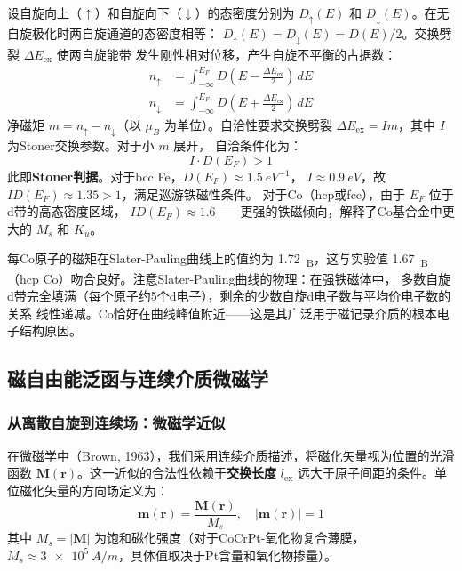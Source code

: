 \documentclass[11pt,a4paper,twoside]{article}
\theoremstyle{definition}
\theoremstyle{plain}
\theoremstyle{remark}
\begin{document}
设自旋向上（$\uparrow$）和自旋向下（$\downarrow$）的态密度分别为
$D_\uparrow(E)$ 和 $D_\downarrow(E)$。在无自旋极化时两自旋通道的态密度相等：
$D_\uparrow(E) = D_\downarrow(E) = D(E)/2$。交换劈裂 $\Delta E_{\text{ex}}$ 使两自旋能带
发生刚性相对位移，产生自旋不平衡的占据数：
\begin{align}
  n_\uparrow &= \int_{-\infty}^{E_F} D\left(E - \frac{\Delta E_{\text{ex}}}{2}\right)\, dE \\
  n_\downarrow &= \int_{-\infty}^{E_F} D\left(E + \frac{\Delta E_{\text{ex}}}{2}\right)\, dE
\end{align}
净磁矩 $m = n_\uparrow - n_\downarrow$（以 $\mu_B$ 为单位）。自洽性要求交换劈裂
$\Delta E_{\text{ex}} = I m$，其中 $I$ 为Stoner交换参数。对于小 $m$ 展开，
自洽条件化为：
\begin{equation}\label{eq:stoner-criterion}
  I \cdot D(E_F) > 1
\end{equation}
此即\textbf{Stoner判据}。对于bcc Fe，$D(E_F) \approx \SI{1.5}{eV^{-1}}$，
$I \approx \SI{0.9}{eV}$，故 $I D(E_F) \approx 1.35 > 1$，满足巡游铁磁性条件。
对于Co（hcp或fcc），由于 $E_F$ 位于d带的高态密度区域，
$I D(E_F) \approx 1.6$——更强的铁磁倾向，解释了Co基合金中更大的 $M_s$ 和 $K_u$。

每Co原子的磁矩在Slater-Pauling曲线上的值约为 \SI{1.72}{\mu_B}，这与实验值
\SI{1.67}{\mu_B}（hcp Co）吻合良好。注意Slater-Pauling曲线的物理：在强铁磁体中，
多数自旋d带完全填满（每个原子约5个d电子），剩余的少数自旋d电子数与平均价电子数的关系
线性递减。Co恰好在曲线峰值附近——这是其广泛用于磁记录介质的根本电子结构原因。

\subsection{磁自由能泛函与连续介质微磁学}

\subsubsection{从离散自旋到连续场：微磁学近似}

在微磁学中（Brown, 1963），我们采用连续介质描述，将磁化矢量视为位置的光滑函数
$\mathbf{M}(\mathbf{r})$。这一近似的合法性依赖于\textbf{交换长度}
$l_{\text{ex}}$ 远大于原子间距的条件。单位磁化矢量的方向场定义为：
\begin{equation}
  \mathbf{m}(\mathbf{r}) = \frac{\mathbf{M}(\mathbf{r})}{M_s}, \quad |\mathbf{m}(\mathbf{r})| = 1
\end{equation}
其中 $M_s = |\mathbf{M}|$ 为饱和磁化强度（对于CoCrPt-氧化物复合薄膜，
$M_s \approx \SI{3e5}{A/m}$，具体值取决于Pt含量和氧化物掺量）。
\end{document}

